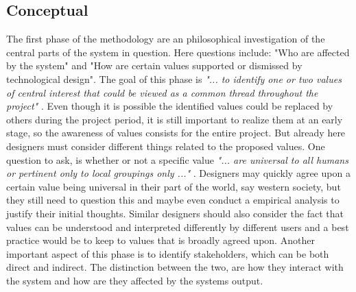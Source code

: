 \subsection{Conceptual}
The first phase of the methodology are an philosophical investigation of the central parts of the system in question. Here questions include: "Who are affected by the system" and "How are certain values supported or dismissed by technological design".\newline 
The goal of this phase is \textit{"... to identify one or two values of central interest that could be viewed as a common thread throughout the project"} \citep[p. 703]{IntegratingEthicsCummings}. Even though it is possible the identified values could be replaced by others during the project period, it is still important to realize them at an early stage, so the awareness of values consists for the entire project. But already here designers must consider different things related to the proposed values. One question to ask, is whether or not a specific value \textit{"... are universal to all humans or pertinent only to local groupings only ..."} \citep[p. 326]{EmbodyingValues}. Designers may quickly agree upon a certain value being universal in their part of the world, say western society, but they still need to question this and maybe even conduct a empirical analysis to justify their initial thoughts. Similar designers should also consider the fact that values can be understood and interpreted differently by different users and a best practice would be to keep to values that is broadly agreed upon. \newline 
Another important aspect of this phase is to identify stakeholders, which can be both direct and indirect. The distinction between the two, are how they interact with the system and how are they affected by the systems output. 

